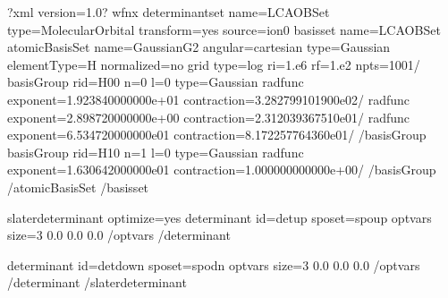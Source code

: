 \documentclass[letterpaper,10pt,english]{sphinxmanual}
\begin{document}
\begin{sphinxVerbatim}[commandchars=\\\{\}]
\PYGZlt{}?xml version=\PYGZdq{}1.0\PYGZdq{}?\PYGZgt{}
\PYGZlt{}wfn\PYGZus{}x\PYGZgt{}
    \PYGZlt{}determinantset name=\PYGZdq{}LCAOBSet\PYGZdq{} type=\PYGZdq{}MolecularOrbital\PYGZdq{} transform=\PYGZdq{}yes\PYGZdq{} source=\PYGZdq{}ion0\PYGZdq{}\PYGZgt{}
      \PYGZlt{}basisset name=\PYGZdq{}LCAOBSet\PYGZdq{}\PYGZgt{}
        \PYGZlt{}atomicBasisSet name=\PYGZdq{}Gaussian\PYGZhy{}G2\PYGZdq{} angular=\PYGZdq{}cartesian\PYGZdq{} type=\PYGZdq{}Gaussian\PYGZdq{} elementType=\PYGZdq{}H\PYGZdq{} normalized=\PYGZdq{}no\PYGZdq{}\PYGZgt{}
          \PYGZlt{}grid type=\PYGZdq{}log\PYGZdq{} ri=\PYGZdq{}1.e\PYGZhy{}6\PYGZdq{} rf=\PYGZdq{}1.e2\PYGZdq{} npts=\PYGZdq{}1001\PYGZdq{}/\PYGZgt{}
          \PYGZlt{}basisGroup rid=\PYGZdq{}H00\PYGZdq{} n=\PYGZdq{}0\PYGZdq{} l=\PYGZdq{}0\PYGZdq{} type=\PYGZdq{}Gaussian\PYGZdq{}\PYGZgt{}
            \PYGZlt{}radfunc exponent=\PYGZdq{}1.923840000000e+01\PYGZdq{} contraction=\PYGZdq{}3.282799101900e\PYGZhy{}02\PYGZdq{}/\PYGZgt{}
            \PYGZlt{}radfunc exponent=\PYGZdq{}2.898720000000e+00\PYGZdq{} contraction=\PYGZdq{}2.312039367510e\PYGZhy{}01\PYGZdq{}/\PYGZgt{}
            \PYGZlt{}radfunc exponent=\PYGZdq{}6.534720000000e\PYGZhy{}01\PYGZdq{} contraction=\PYGZdq{}8.172257764360e\PYGZhy{}01\PYGZdq{}/\PYGZgt{}
          \PYGZlt{}/basisGroup\PYGZgt{}
          \PYGZlt{}basisGroup rid=\PYGZdq{}H10\PYGZdq{} n=\PYGZdq{}1\PYGZdq{} l=\PYGZdq{}0\PYGZdq{} type=\PYGZdq{}Gaussian\PYGZdq{}\PYGZgt{}
            \PYGZlt{}radfunc exponent=\PYGZdq{}1.630642000000e\PYGZhy{}01\PYGZdq{} contraction=\PYGZdq{}1.000000000000e+00\PYGZdq{}/\PYGZgt{}
          \PYGZlt{}/basisGroup\PYGZgt{}
        \PYGZlt{}/atomicBasisSet\PYGZgt{}
      \PYGZlt{}/basisset\PYGZgt{}

    \PYGZlt{}slaterdeterminant optimize=\PYGZdq{}yes\PYGZdq{}\PYGZgt{}
      \PYGZlt{}determinant id=\PYGZdq{}det\PYGZus{}up\PYGZdq{} sposet=\PYGZdq{}spo\PYGZhy{}up\PYGZdq{}\PYGZgt{}
        \PYGZlt{}opt\PYGZus{}vars size=\PYGZdq{}3\PYGZdq{}\PYGZgt{}
          0.0 0.0 0.0
        \PYGZlt{}/opt\PYGZus{}vars\PYGZgt{}
      \PYGZlt{}/determinant\PYGZgt{}

      \PYGZlt{}determinant id=\PYGZdq{}det\PYGZus{}down\PYGZdq{} sposet=\PYGZdq{}spo\PYGZhy{}dn\PYGZdq{}\PYGZgt{}
        \PYGZlt{}opt\PYGZus{}vars size=\PYGZdq{}3\PYGZdq{}\PYGZgt{}
          0.0 0.0 0.0
        \PYGZlt{}/opt\PYGZus{}vars\PYGZgt{}
      \PYGZlt{}/determinant\PYGZgt{}
    \PYGZlt{}/slaterdeterminant\PYGZgt{}


\end{sphinxVerbatim}
\end{document}

